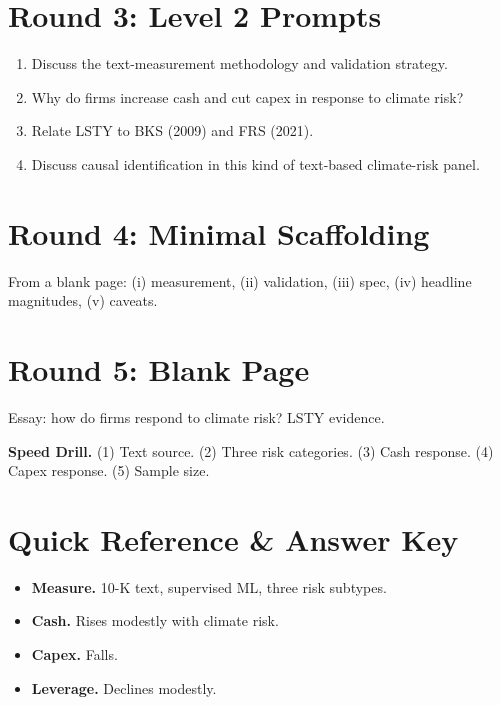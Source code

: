 \documentclass[11pt]{article}
\begin{document}
\section*{Round 3: Level 2 Prompts}
\begin{enumerate}
\item Discuss the text-measurement methodology and validation strategy.
\item Why do firms increase cash and cut capex in response to climate risk?
\item Relate LSTY to BKS (2009) and FRS (2021).
\item Discuss causal identification in this kind of text-based climate-risk panel.
\end{enumerate}

\section*{Round 4: Minimal Scaffolding}
From a blank page: (i) measurement, (ii) validation, (iii) spec, (iv) headline magnitudes, (v) caveats.

\section*{Round 5: Blank Page}
Essay: how do firms respond to climate risk? LSTY evidence.

\vspace{6pt}
\begin{drillbox}
\textbf{Speed Drill.} (1) Text source. (2) Three risk categories. (3) Cash response. (4) Capex response. (5) Sample size.
\end{drillbox}

\section*{Quick Reference \& Answer Key}
\begin{answerbox}
\begin{itemize}
\item \textbf{Measure.} 10-K text, supervised ML, three risk subtypes.
\item \textbf{Cash.} Rises modestly with climate risk.
\item \textbf{Capex.} Falls.
\item \textbf{Leverage.} Declines modestly.
\end{itemize}
\end{answerbox}
\end{document}
